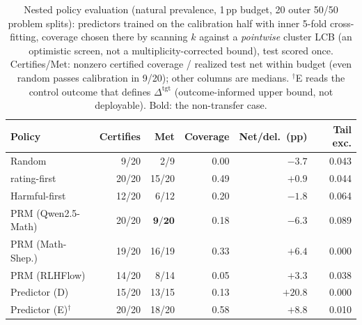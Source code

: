 \documentclass[11pt]{article}
\begin{document}
\begin{table}[t]
\centering
\scriptsize
\setlength{\tabcolsep}{2.4pt}
\begin{tabular}{@{}lrrrrr@{}}
\toprule
Policy & Certifies & Met & Coverage & Net/del.\ (pp) & Tail exc. \\
\midrule
Random             & 9/20  & 2/9   & 0.00 & $-3.7$ & 0.043 \\
rating-first       & 20/20 & 15/20 & 0.49 & $+0.9$ & 0.044 \\
Harmful-first      & 12/20 & 6/12  & 0.20 & $-1.8$ & 0.064 \\
PRM (Qwen2.5-Math) & 20/20 & $\mathbf{9/20}$ & 0.18 & $\mathbf{-6.3}$ & 0.089 \\
PRM (Math-Shep.)   & 19/20 & 16/19 & 0.33 & $+6.4$ & 0.000 \\
PRM (RLHFlow)      & 14/20 & 8/14  & 0.05 & $+3.3$ & 0.038 \\
Predictor (D)      & 15/20 & 13/15 & 0.13 & $+20.8$ & 0.000 \\
Predictor (E)$^{\dagger}$ & 20/20 & 18/20 & 0.58 & $+8.8$ & 0.010 \\
\bottomrule
\end{tabular}
\caption{Nested policy evaluation (natural prevalence, 1\,pp budget, 20 outer 50/50 problem splits): predictors trained on the calibration half with inner 5-fold cross-fitting, coverage chosen there by scanning $k$ against a \emph{pointwise} cluster LCB (an optimistic screen, not a multiplicity-corrected bound), test scored once. Certifies/Met: nonzero certified coverage / realized test net within budget (even random passes calibration in 9/20); other columns are medians. $^{\dagger}$E reads the control outcome that defines $\Delta^{\mathrm{tgt}}$ (outcome-informed upper bound, not deployable). Bold: the non-transfer case.}
\label{tab:nested}
\end{table}
\end{document}
